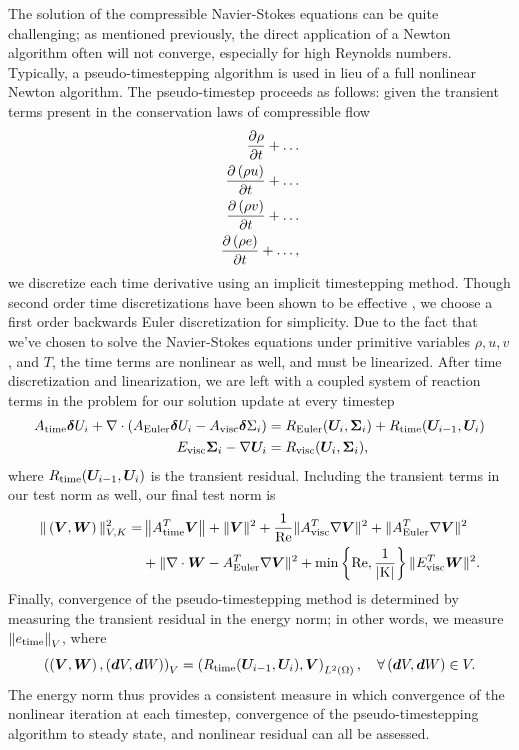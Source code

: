 The solution of the compressible Navier-Stokes equations can be quite challenging; as mentioned previously, the direct application of a Newton algorithm often will not converge, especially for high Reynolds numbers.  Typically, a pseudo-timestepping algorithm is used in lieu of a full nonlinear Newton algorithm. The pseudo-timestep proceeds as follows: given the transient terms present in the conservation laws of compressible flow
\begin{align*}
\pd{\rho}{t} + \ldots \\
\pd{\LRp{\rho u}}{t} + \ldots \\
\pd{\LRp{\rho v}}{t} + \ldots \\
\pd{\LRp{\rho e}}{t} + \ldots,
\end{align*}
we discretize each time derivative using an implicit timestepping method.  Though second order time discretizations have been shown to be effective \cite{Demkowicz1990275, BenKirk}, we choose a first order backwards Euler discretization for simplicity.  Due to the fact that we've chosen to solve the Navier-Stokes equations under primitive variables $\rho, u, v$, and $T$, the time terms are nonlinear as well, and must be linearized.  After time discretization and linearization, we are left with a coupled system of reaction terms in the problem for our solution update at every timestep
\begin{align*}
A_{\rm time}\boldsymbol \delta U_i + \div \left(A_{\rm Euler}\boldsymbol \delta U_i - A_{\rm visc}\boldsymbol \delta \Sigma_i\right) &= R_{\rm Euler}(\boldsymbol U_i,\boldsymbol \Sigma_i) + R_{\rm time}(\boldsymbol U_{i-1},\boldsymbol U_i)\\
E_{\rm visc} \boldsymbol \Sigma_i - \grad \boldsymbol U_i &= R_{\rm visc}(\boldsymbol U_i,\boldsymbol \Sigma_i),
\end{align*}
where $R_{\rm time}(\boldsymbol U_{i-1},\boldsymbol U_i)$ is the transient residual.  Including the transient terms in our test norm as well, our final test norm is 
\begin{align*}
\|\left(\boldsymbol V,\boldsymbol W\right)\|_{V,K}^2 =& \nor{A_{\rm time}^T\boldsymbol V} + \|\boldsymbol V\|^2 + \frac{1}{\Reyn} \|A_{\rm visc}^T\grad \boldsymbol V\|^2 + \|A_{\rm Euler}^T \grad \boldsymbol V\|^2 \\
& + \| \div \boldsymbol W - A_{\rm Euler}^T \grad \boldsymbol V\|^2 + \min\left\{\Reyn,\frac{1}{|K|}\right\}\|E_{\rm visc}^T\boldsymbol W\|^2.
\end{align*}
Finally, convergence of the pseudo-timestepping method is determined by measuring the transient residual in the energy norm; in other words, we measure $\nor{e_{\rm time}}_V$, where
\[
\LRp{\LRp{\boldsymbol V,\boldsymbol W},\LRp{\boldsymbol dV,\boldsymbol dW}}_V = \LRp{R_{\rm time}(\boldsymbol U_{i-1},\boldsymbol U_i),\boldsymbol V}_{\L}, \quad \forall \LRp{\boldsymbol dV,\boldsymbol dW} \in V.
\]
The energy norm thus provides a consistent measure in which convergence of the nonlinear iteration at each timestep, convergence of the pseudo-timestepping algorithm to steady state, and nonlinear residual can all be assessed.  


